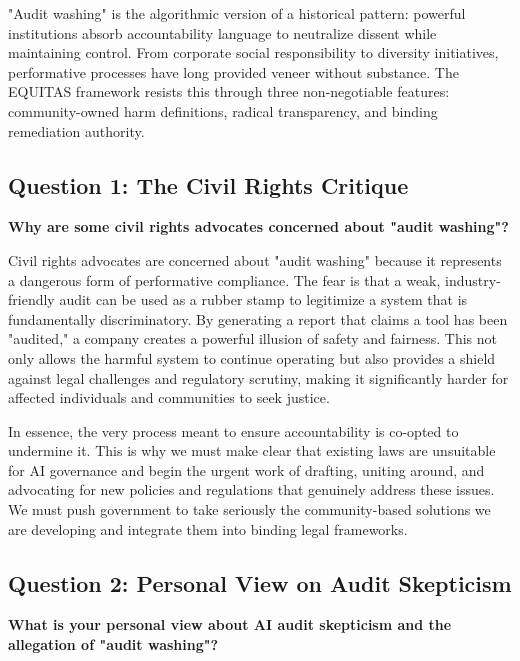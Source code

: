 \documentclass[12pt,letterpaper]{article}
\begin{document}
\begin{keyfindings}
"Audit washing" is the algorithmic version of a historical pattern: powerful institutions absorb accountability language to neutralize dissent while maintaining control. From corporate social responsibility to diversity initiatives, performative processes have long provided veneer without substance. The EQUITAS framework resists this through three non-negotiable features: community-owned harm definitions, radical transparency, and binding remediation authority.
\end{keyfindings}

\subsection*{Question 1: The Civil Rights Critique}
\textbf{Why are some civil rights advocates concerned about "audit washing"?}

Civil rights advocates are concerned about "audit washing" because it represents a dangerous form of performative compliance. The fear is that a weak, industry-friendly audit can be used as a rubber stamp to legitimize a system that is fundamentally discriminatory. By generating a report that claims a tool has been "audited," a company creates a powerful illusion of safety and fairness. This not only allows the harmful system to continue operating but also provides a shield against legal challenges and regulatory scrutiny, making it significantly harder for affected individuals and communities to seek justice.

In essence, the very process meant to ensure accountability is co-opted to undermine it. This is why we must make clear that existing laws are unsuitable for AI governance and begin the urgent work of drafting, uniting around, and advocating for new policies and regulations that genuinely address these issues. We must push government to take seriously the community-based solutions we are developing and integrate them into binding legal frameworks.

\subsection*{Question 2: Personal View on Audit Skepticism}
\textbf{What is your personal view about AI audit skepticism and the allegation of "audit washing"?}
\end{document}
